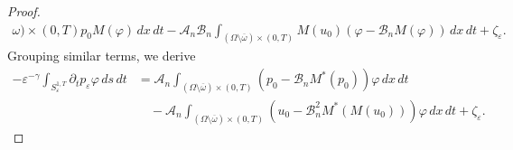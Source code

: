 \documentclass[reqno]{amsart}
\begin{document}
\begin{proof}
\begin{align*}
{{\omega })\times (0,T)}p_0M(\varphi )\,dx\,dt-\mathcal{A}_n\mathcal{B}%
_n\int _{(\Omega \setminus \overline{\omega })\times
(0,T)}M(u_0)(\varphi -\mathcal{B}_nM(\varphi ))\,dx\,dt+\zeta
_{\varepsilon }.
\end{align*}
Grouping similar terms, we derive
\begin{equation}
\begin{aligned}
-\varepsilon ^{-\gamma }\int _{S_{\varepsilon }^{1,T}}\partial
_{t}p_{\varepsilon }\varphi \,ds\,dt
&=\mathcal{A}_n\int _{(\Omega
\setminus \overline{\omega })\times (0,T)}(p_0-\mathcal{B}_nM^{\ast
}(p_0))\varphi \,dx\,dt    \\
&\quad -\mathcal{A}_n\int _{(\Omega \setminus \overline{\omega })\times
(0,T)}(u_0-\mathcal{B}_n^2M^{\ast }(M(u_0)))\varphi \,dx\,dt+\zeta
_{\varepsilon }.
\end{aligned}  \label{pa_t p uncont}
\end{equation}


\end{proof}
\end{document}
